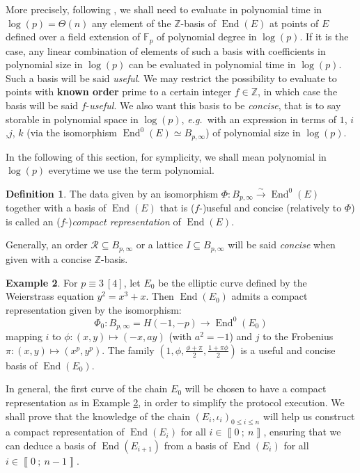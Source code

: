 \documentclass[a4paper,10pt,notitlepage]{report}
\theoremstyle{definition}
\newtheorem{Definition}{Definition}[chapter]
\theoremstyle{plain}
\theoremstyle{definition}
\newtheorem{Example}[Definition]{Example}
\newcommand{\eg}{\emph{e.g.}\ }
\newcommand{\Z}{\mathbb{Z}}
\newcommand{\F}{\mathbb{F}}
\newcommand{\m}[1]{\mathcal{#1}}
\renewcommand{\i}[2]{\left\llbracket #1~;~#2\right\rrbracket}
\renewcommand{\(}{\left(}
\renewcommand{\)}{\right)}
\DeclareMathOperator{\End}{End}
\begin{document}
More precisely, following \cite{LP_merged}, we shall need to evaluate in polynomial time in $\log(p)=\Theta(n)$ any element of the $\Z$-basis of $\End(E)$ at points of $E$ defined over a field extension of $\F_p$ of polynomial degree in $\log(p)$. If it is the case,  any linear combination of elements of such a basis with coefficients in polynomial size in $\log(p)$ can be evaluated in polynomial time in $\log(p)$.  Such a basis will be said \emph{useful}.  We may restrict the possibility to evaluate to points with \textbf{known order} prime to a certain integer $f\in\Z$,  in which case the basis will be said $f$-\emph{useful}. We also want this basis to be \emph{concise}, that is to say storable in polynomial space in $\log(p)$, \eg with an expression in terms of $1$, $i$,$j$, $k$ (via the isomorphism $\End^0(E)\simeq B_{p,\infty}$) of polynomial size in $\log(p)$. 

In the following of this section, for symplicity, we shall mean polynomial in $\log(p)$ everytime we use the term polynomial.

\begin{Definition}\label{Definition 3}
The data given by an isomorphism $\Phi : B_{p,\infty} \overset{\sim}{\longrightarrow}\End^0(E)$ together with a basis of $\End(E)$ that is ($f$-)useful and concise (relatively to $\Phi$) is called an ($f$-)\emph{compact representation} of $\End(E)$.

Generally, an order $\m{R}\subseteq B_{p,\infty}$ or a lattice $I\subseteq B_{p,\infty}$ will be said \emph{concise} when given with a concise $\Z$-basis.
\end{Definition}

\begin{Example}\label{Example 2}
For $p\equiv 3 \ [4]$, let $E_0$ be the elliptic curve defined by the Weierstrass equation $y^2=x^3+x$. Then $\End(E_0)$ admits a compact representation given by the isomorphism: 
\[\Phi_0 : B_{p,\infty}=H(-1,-p) \longrightarrow\End^0(E_0)\] 
mapping $i$ to $\phi : (x,y)\longmapsto (-x,ay)$ (with $a^2=-1$) and $j$ to the Frobenius $\pi : (x,y)\longmapsto (x^p,y^p)$. The family $\(1, \phi,\frac{\phi+\pi}{2},\frac{1+\pi\phi}{2}\)$ is a useful and concise basis of $\End(E_0)$.
\end{Example}

In general, the first curve of the chain $E_0$ will be chosen to have a compact representation as in Example \ref{Example 2}, in order to simplify the protocol execution. We shall prove that the knowledge of the chain $(E_i,\iota_i)_{0\leq i\leq n}$ will help us construct a compact representation of $\End(E_i)$ for all $i\in\i{0}{n}$, ensuring that we can deduce a basis of $\End(E_{i+1})$ from a basis of $\End(E_i)$ for all $i\in\i{0}{n-1}$.
\end{document}
